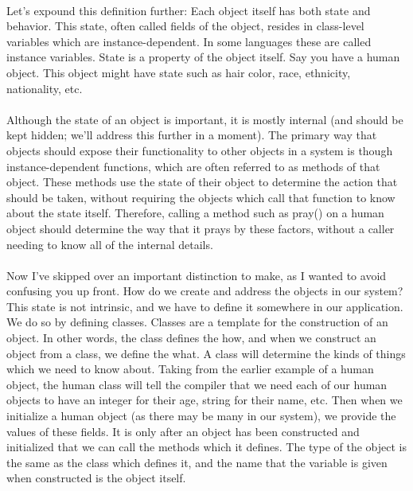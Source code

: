 \documentclass{article}
\begin{document}
\paragraph{}
Let’s expound this definition further: Each object itself has both state and behavior. This state, often called fields of the object, resides in class-level variables which are instance-dependent. In some languages these are called instance variables. State is a property of the object itself. Say you have a human object. This object might have state such as hair color, race, ethnicity, nationality, etc. 
\paragraph{}
Although the state of an object is important, it is mostly internal (and should be kept hidden; we'll address this further in a moment). The primary way that objects should expose their functionality to other objects in a system is though instance-dependent functions, which are often referred to as methods of that object. These methods use the state of their object to determine the action that should be taken, without requiring the objects which call that function to know about the state itself. Therefore, calling a method such as pray() on a human object should determine the way that it prays by these factors, without a caller needing to know all of the internal details.
\paragraph{}
Now I've skipped over an important distinction to make, as I wanted to avoid confusing you up front. How do we create and address the objects in our system? This state is not intrinsic, and we have to define it somewhere in our application. We do so by defining classes. Classes are a template for the construction of an object. In other words, the class defines the how, and when we construct an object from a class, we define the what. A class will determine the kinds of things which we need to know about. Taking from the earlier example of a human object, the human class will tell the compiler that we need each of our human objects to have an integer for their age, string for their name, etc. Then when we initialize a human object (as there may be many in our system), we provide the values of these fields. It is only after an object has been constructed and initialized that we can call the methods which it defines. The type of the object is the same as the class which defines it, and the name that the variable is given when constructed is the object itself. 
\end{document}

